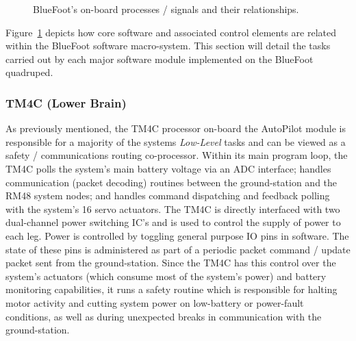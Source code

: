 		\begin{figure}[h!]
			\centering
			\caption{BlueFoot's on-board processes / signals and their relationships.}
			\label{fig::process_diagram}
		\end{figure}

		Figure~\ref{fig::process_diagram} depicts how core software and associated control elements are related within the BlueFoot software macro-system. This section will detail the tasks carried out by each major software module implemented on the BlueFoot quadruped.

		\subsubsection{TM4C (Lower Brain)}

			As previously mentioned, the TM4C processor on-board the AutoPilot module is responsible for a majority of the systems \emph{Low-Level} tasks and can be viewed as a safety / communications routing co-processor. Within its main program loop, the TM4C polls the system's main battery voltage via an ADC interface; handles communication (packet decoding) routines between the ground-station and the RM48 system nodes; and handles command dispatching and feedback polling with the system's 16 servo actuators. The TM4C is directly interfaced with two dual-channel power switching IC's and is used to control the supply of power to each leg. Power is controlled by toggling general purpose IO pins in software. The state of these pins is administered as part of a periodic packet command / update packet sent from the ground-station. Since the TM4C has this control over the system's actuators (which consume most of the system's power) and battery monitoring capabilities, it runs a safety routine which is responsible for halting motor activity and cutting system power on low-battery or power-fault conditions, as well as during unexpected breaks in communication with the ground-station.

